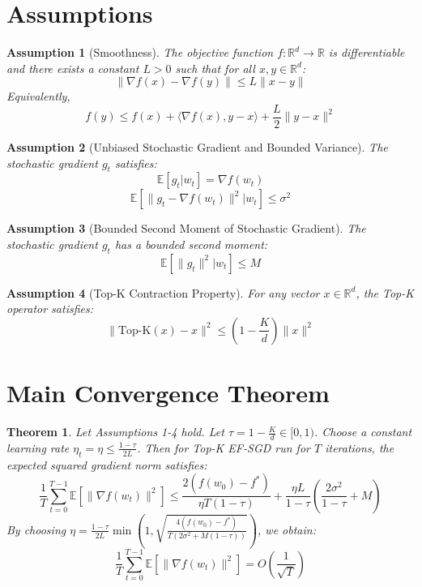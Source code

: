 \documentclass{article}
\newtheorem{theorem}{Theorem}
\newtheorem{assumption}{Assumption}
\newcommand{\E}{\mathbb{E}}
\newcommand{\R}{\mathbb{R}}
\begin{document}
\section*{Assumptions}

\begin{assumption}[Smoothness]
The objective function $f: \R^d \to \R$ is differentiable and there exists a constant $L > 0$ such that for all $x, y \in \R^d$:
$$ \|\nabla f(x) - \nabla f(y)\| \leq L \|x - y\| $$
Equivalently, 
$$ f(y) \leq f(x) + \langle \nabla f(x), y-x \rangle + \frac{L}{2} \|y-x\|^2 $$
\end{assumption}

\begin{assumption}[Unbiased Stochastic Gradient and Bounded Variance]
The stochastic gradient $g_t$ satisfies:
$$ \E[g_t | w_t] = \nabla f(w_t) $$
$$ \E[\|g_t - \nabla f(w_t)\|^2 | w_t] \leq \sigma^2 $$
\end{assumption}

\begin{assumption}[Bounded Second Moment of Stochastic Gradient]
The stochastic gradient $g_t$ has a bounded second moment:
$$ \E[\|g_t\|^2 | w_t] \leq M $$
\end{assumption}

\begin{assumption}[Top-K Contraction Property]
For any vector $x \in \R^d$, the Top-K operator satisfies:
$$ \|\text{Top-K}(x) - x\|^2 \leq \left(1 - \frac{K}{d}\right) \|x\|^2 $$
\end{assumption}

\section*{Main Convergence Theorem}

\begin{theorem}
Let Assumptions 1-4 hold. Let $\tau = 1 - \frac{K}{d} \in [0, 1)$. Choose a constant learning rate $\eta_t = \eta \leq \frac{1-\tau}{2L}$. Then for Top-K EF-SGD run for $T$ iterations, the expected squared gradient norm satisfies:
$$ \frac{1}{T} \sum_{t=0}^{T-1} \E[\|\nabla f(w_t)\|^2] \leq \frac{2(f(w_0) - f^*)}{\eta T (1-\tau)} + \frac{\eta L}{1-\tau} \left( \frac{2\sigma^2}{1-\tau} + M \right) $$
By choosing $\eta = \frac{1-\tau}{2L} \min\left(1, \sqrt{\frac{4(f(w_0)-f^*)}{T(2\sigma^2 + M(1-\tau))}}\right)$, we obtain:
$$ \frac{1}{T} \sum_{t=0}^{T-1} \E[\|\nabla f(w_t)\|^2] = O\left(\frac{1}{\sqrt{T}}\right) $$
\end{theorem}
\end{document}
